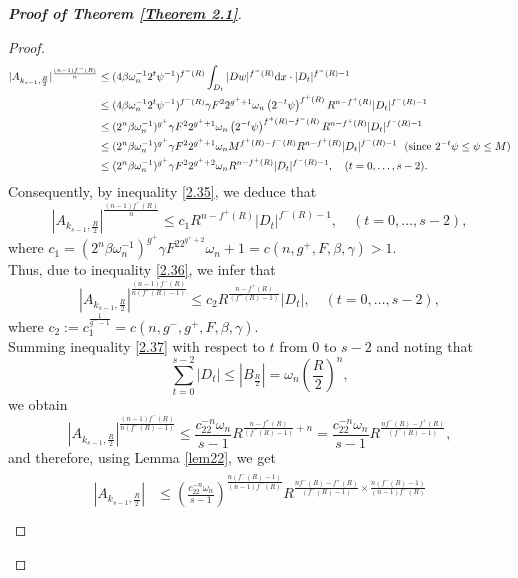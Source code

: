 \documentclass[10pt,reqno]{amsart}
\newcommand *\w{^\wedge}
\theoremstyle{definition}
\numberwithin{equation}{section}
\begin{document}
\begin{proof}[\textbf{Proof of Theorem \ref{Theorem 2.1}}]
\begin{proof}
\begin{align}\label{2.35}
\begin{split}
|A_{k_{s-1}, \frac{R}{2}}|^{\frac{(n-1)f^-(R)}{n}} &\leq (4\beta\omega_n^{-1}2^t\psi^{-1})^{f^-(R)} \int_{D_t} |Dw|^{f^-(R)} {\rm d}x \cdot |D_t|^{f^-(R) - 1}\\
&\leq (4\beta\omega_n^{-1}2^t\psi^{-1})^{f^-(R)}\gamma F^22^{g^++1}\omega_n\left(2^{-t}\psi\right)^{f^+(R)} R^{n-f^+(R)}|D_t|^{f^-(R) - 1}\\
&\leq (2^n\beta\omega_n^{-1})^{g^+}\gamma F^22^{g^++1}\omega_n\left(2^{-t}\psi\right)^{f^+(R)-f^-(R)} R^{n-f^+(R)}|D_t|^{f^-(R) - 1}\\
&\leq (2^n\beta\omega_n^{-1})^{g^+}\gamma F^22^{g^++1}\omega_n M^{f^+(R)-f^-(R)} R^{n-f^+(R)}|D_t|^{f^-(R) - 1}\ \ (\text{since}\ 2^{-t}\psi \leq \psi \leq M )\\
&\leq (2^n\beta\omega_n^{-1})^{g^+}\gamma F^22^{g^++2}\omega_n  R^{n-f^+(R)}|D_t|^{f^-(R) - 1},\quad (t = 0, \ldots, s - 2).
\end{split}
\end{align}
Consequently, by inequality \eqref{2.35}, we deduce that
\begin{equation}\label{2.36}
|A_{k_{s-1}, \frac{R}{2}}|^{\frac{(n-1)f^-(R)}{n}} \leq c_1 R^{n - f^+(R)} |D_t|^{f^-(R) - 1}, \quad (t = 0, \ldots, s - 2),
\end{equation}
where \(c_1 = (2^n\beta\omega_n^{-1})^{g^+}\gamma F^22^{g^++2}\omega_n + 1 = c(n,g^+,F,\beta,\gamma) > 1\).\\
Thus, due to inequality \eqref{2.36}, we infer that
\begin{equation}\label{2.37}
|A_{k_{s-1}, \frac{R}{2}}|^{\frac{(n-1)f^-(R)}{n(f^-(R) - 1)}} \leq c_2R^{\frac{n-f^+(R)}{(f^-(R) - 1)}} |D_t|, \quad (t = 0, \ldots, s - 2),
\end{equation}
where \(c_2:=  c_1^{\frac{1}{g^--1}}=c(n,g^-,g^+,F,\beta,\gamma)\).\\
Summing inequality \eqref{2.37} with respect to \(t\) from $0$ to \(s - 2\) and noting that
\[
\sum_{t=0}^{s-2} |D_t|\leq |B_{\frac{R}{2}}| = \omega_n \left(\frac{R}{2}\right)^n,
\]
we obtain
\[
|A_{k_{s-1}, \frac{R}{2}}|^{\frac{(n-1)f^-(R)}{n(f^-(R) - 1)}} \leq \frac{c_22^{-n}\omega_n}{s  - 1} R^{\frac{n-f^+(R)}{(f^-(R) - 1)}+n}=\frac{c_22^{-n}\omega_n}{s - 1} R^{\frac{nf^-(R)-f^+(R)}{(f^-(R) - 1)}},
\]
and therefore, using Lemma \ref{lem22}, we get
\begin{align}\label{2.38}
\begin{split}
|A_{k_{s-1}, \frac{R}{2}}| &\leq \left(\frac{c_22^{-n}\omega_n}{s - 1}\right)^{\frac{n(f^-(R) - 1)}{(n-1)f^-(R)}} R^{\frac{nf^-(R)-f^+(R)}{(f^-(R) - 1)}\times\frac{n(f^-(R) - 1)}{(n-1)f^-(R)}}\\

\end{split}
\end{align}
\end{proof}
\end{proof}
\end{document}
